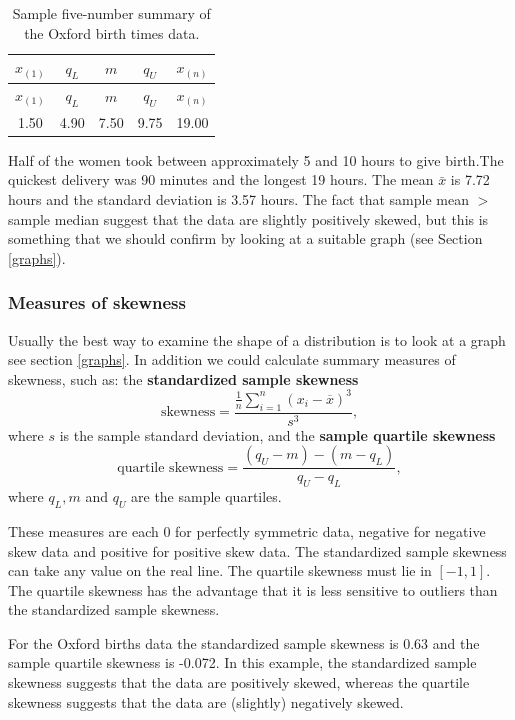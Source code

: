 \documentclass[
  british,
]{book}
\begin{document}
\begin{longtable}[]{@{}ccccc@{}}
\caption{\label{tab:oxfivenum} Sample five-number summary of the Oxford birth times data.}\tabularnewline
\toprule
\(x_{(1)}\) & \(q_L\) & \(m\) & \(q_U\) & \(x_{(n)}\)\tabularnewline
\midrule
\endfirsthead
\toprule
\(x_{(1)}\) & \(q_L\) & \(m\) & \(q_U\) & \(x_{(n)}\)\tabularnewline
\midrule
\endhead
1.50 & 4.90 & 7.50 & 9.75 & 19.00\tabularnewline
\bottomrule
\end{longtable}

Half of the women took between approximately 5 and 10 hours to give birth.The quickest delivery was 90 minutes and the longest 19 hours. The mean \(\bar{x}\) is 7.72 hours and the standard deviation is 3.57 hours. The fact that sample mean \(>\) sample median suggest that the data are slightly positively skewed, but this is something that we should confirm by looking at a suitable graph (see Section \ref{graphs}).

\hypertarget{measures-of-skewness}{%
\subsubsection*{Measures of skewness}\label{measures-of-skewness}}

Usually the best way to examine the shape of a distribution is to look at a graph see section \ref{graphs}. In addition we could calculate summary measures of skewness, such as: the \textbf{standardized sample skewness}
\[\mbox{skewness} = \frac{\displaystyle\frac1n \sum_{i=1}^n (x_i-
\overline{x})^3}{s^3}, \]
where \(s\) is the sample standard deviation, and the \textbf{sample quartile
skewness}
\[\mbox{quartile skewness} = \frac{(q_U-m)-(m-q_L)}{q_U-q_L}, \]
where \(q_L, m\) and \(q_U\) are the sample quartiles.

These measures are each 0 for perfectly symmetric data, negative for negative skew data and positive for positive skew data. The standardized sample skewness can take any value on the real line. The quartile skewness must lie in \([-1, 1]\). The quartile skewness has the advantage that it is less sensitive to outliers than the standardized sample skewness.

For the Oxford births data the standardized sample skewness is 0.63 and the sample quartile skewness is -0.072. In this example, the standardized sample skewness suggests that the data are positively skewed, whereas the quartile skewness suggests that the data are (slightly) negatively skewed.
\end{document}
